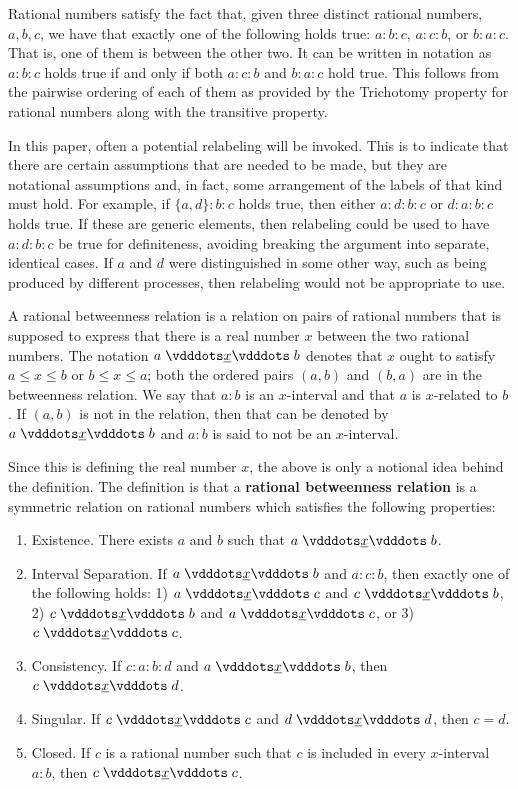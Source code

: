 \documentclass{rmj-public}
\begin{document}
Rational numbers satisfy the fact that, given three distinct rational numbers, $a, b, c$, we have that exactly one of the following holds true: $a:b:c$, $a:c:b$, or $b:a:c$. That is, one of them is between the other two. It can be written in notation as $a:b:c$ holds true if and only if both \sout{$a:c:b$} and \sout{$b:a:c$} hold true. This follows from the pairwise ordering of each of them as provided by the Trichotomy property for rational numbers along with the transitive property. 

In this paper, often a potential relabeling will be invoked. This is to indicate that there are certain assumptions that are needed to be made, but they are notational assumptions and, in fact, some arrangement of the labels of that kind must hold. For example, if $\{a,d\}:b:c$ holds true, then either $a:d:b:c$ or $d:a:b:c$ holds true. If these are generic elements, then relabeling could be used to have $a:d:b:c$  be  true for definiteness, avoiding breaking the argument into separate, identical cases. If $a$ and $d$ were distinguished in some other way, such as being produced by different processes, then relabeling would not be appropriate to use. 

A rational betweenness relation is a relation on pairs of rational numbers that is supposed to express that there is a real number $x$ between the two rational numbers. The notation $a \xrel b$ denotes that $x$ ought to satisfy $a \leq x \leq b$ or $b \leq x \leq a$;  both the ordered pairs $(a,b)$ and $(b,a)$ are in the betweenness relation. We say that $a:b$ is an $x$-interval and that $a$ is $x$-related to $b$. If $(a,b)$ is not in the relation, then that can be denoted by \sout{$a \xrel b$} and $a:b$ is said to not be an $x$-interval. 

Since this is defining the real number $x$, the above is only a notional idea behind the definition. The definition is that a \textbf{rational betweenness relation} is a symmetric relation on rational numbers 
which satisfies the following properties:
\begin{enumerate}
    \item Existence. There exists $a$ and $b$ such that $a\xrel b$.
    \item Interval Separation. If $a \xrel b$ and $a : c : b$, then exactly one of the following holds: 1) $a \xrel c$ and \sout{$c \xrel b$}, 2) $c \xrel b$ and \sout{$a \xrel c$}, or 3) $c \xrel c$. 
    \item Consistency. If $c : a : b : d$ and $a \xrel b$, then $c \xrel d$. 
    \item Singular. If $c \xrel c$ and $d \xrel d$, then $c=d$. 
    \item Closed. If $c$ is a rational number such that $c$ is included in every $x$-interval $a:b$, then  $c \xrel c$. 
\end{enumerate}
\end{document}
